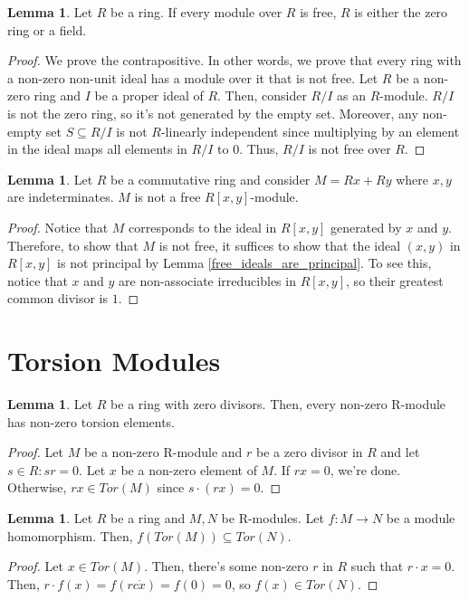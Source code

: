 \documentclass{article}
\theoremstyle{definition}
\newtheorem{lemma}[theorem]{Lemma}
\begin{document}
\begin{lemma}
    Let $R$ be a ring. If every module over $R$ is free, $R$ is either the zero ring or a field.
\end{lemma}
\begin{proof}
    We prove the contrapositive. In other words, we prove that every ring with a non-zero non-unit ideal has a module over it that is not free. Let $R$ be a non-zero ring and $I$ be a proper ideal of $R$. Then, consider $R/I$ as an $R$-module. $R/I$ is not the zero ring, so it's not generated by the empty set. Moreover, any non-empty set $S \subseteq R/I$ is not $R$-linearly independent since multiplying by an element in the ideal maps all elements in $R/I$ to $0$. Thus, $R/I$ is not free over $R$.
\end{proof}

\begin{lemma}
    Let $R$ be a commutative ring and consider $M = Rx + Ry$ where $x,y$ are indeterminates. $M$ is not a free $R[x,y]$-module.
\end{lemma}
\begin{proof}
    Notice that $M$ corresponds to the ideal in $R[x,y]$ generated by $x$ and $y$. Therefore, to show that $M$ is not free,
    it suffices to show that the ideal $(x,y)$ in $R[x,y]$ is not principal by Lemma \ref{free_ideals_are_principal}. To see this, notice that $x$ and $y$
    are non-associate irreducibles in $R[x,y]$, so their greatest common divisor is $1$.
\end{proof}

\newpage

\section{Torsion Modules}

\begin{lemma}
    Let $R$ be a ring with zero divisors. Then, every non-zero R-module has non-zero torsion elements.
\end{lemma}
\begin{proof}
    Let $M$ be a non-zero R-module and $r$ be a zero divisor in $R$ and let $s \in R: sr = 0$. Let $x$ be a non-zero element of $M$. If $rx = 0$, we're done. Otherwise, $rx \in Tor(M)$ since $s \cdot (rx) = 0$.
\end{proof}

\begin{lemma}
    Let $R$ be a ring and $M,N$ be R-modules. Let $f: M \xrightarrow{} N$ be a module homomorphism. Then, $f(Tor(M)) \subseteq Tor(N)$.
\end{lemma}
\begin{proof}
    Let $x \in Tor(M)$. Then, there's some non-zero $r$ in $R$ such that $r \cdot x = 0$. Then, $r \cdot f(x) = f(r c\dot x) = f(0) = 0$, so $f(x) \in Tor(N)$.
\end{proof}
\end{document}
